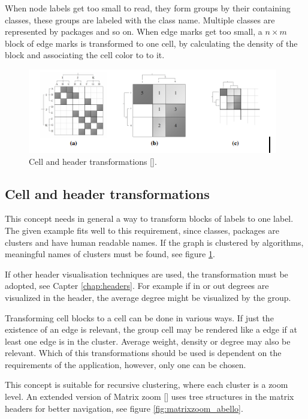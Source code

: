 When node labels get too small to read, they form groups by their containing classes, these groups are labeled with the class name. Multiple classes are represented by packages and so on. When edge marks get too small, a $n \times m$ block of edge marks is transformed to one cell, by calculating the density of the block and associating the cell color to to it.

\begin{figure}[h]
\centering
\includegraphics{images/matrixzoom_transform}
\caption{Cell and header transformations [\cite{ham-ivis-2003}]. \label{fig:matrixzoom_transform}}
\end{figure}




\subsection{Cell and header transformations}   
This concept needs in general a way to transform blocks of labels to one label. The given example fits well to this requirement, since classes, packages are clusters and have human readable names. If the graph is clustered by algorithms, meaningful names of clusters must be found, see figure \ref{fig:matrixzoom_transform}.

If other header visualisation techniques are used, the transformation must be adopted, see Capter \ref{chap:headers}. For example if in or out degrees are visualized in the header, the average degree might be visualized by the group.

Transforming cell blocks to a cell can be done in various ways. If just the existence of an edge is relevant, the group cell may be rendered like a edge if at least one edge is in the cluster. Average weight, density or degree may also be relevant. Which of this transformations should be used is dependent on the requirements of the application, however, only one can be chosen.

This concept is suitable for recursive clustering, where each cluster is a zoom level. An extended version of Matrix zoom  [\cite{abello2004}] uses tree structures in the matrix headers for better navigation, see figure \ref{fig:matrixzoom_abello}.

